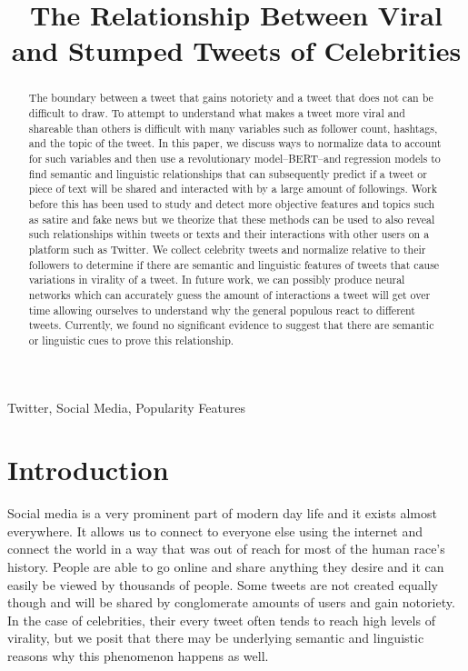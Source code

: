 \documentclass{article}
\title{The Relationship Between Viral and Stumped Tweets of Celebrities}
\begin{document}
\maketitle

\begin{abstract}
The boundary between a tweet that gains notoriety and a tweet that does not can be difficult to draw. 
To attempt to understand what makes a tweet more viral and shareable than others is difficult with many variables such as
follower count, hashtags, and the topic of the tweet. In this paper, we discuss ways to normalize data to account for such variables 
and then use a revolutionary model--BERT--and regression models to find semantic and linguistic relationships that can subsequently predict if a tweet or piece of text 
will be shared and interacted with by a large amount of followings. Work before this has been used to study and detect more objective features and topics such as 
satire and fake news but we theorize that these methods can be used to also reveal such relationships within tweets or texts and their interactions with other users 
on a platform such as Twitter. 
We collect celebrity tweets and normalize relative to their followers to determine if there are semantic and linguistic features of tweets that cause variations in virality of a tweet. 
In future work, we can possibly produce neural networks which can accurately guess the amount of interactions a tweet will get over time allowing ourselves to understand why the general populous react to different tweets. 
Currently, we found no significant evidence to suggest that there are semantic or linguistic cues to prove this relationship.
\end{abstract}

\begin{keywords}
Twitter, Social Media, Popularity Features
\end{keywords}

\section{Introduction}
\label{sec:intro}

Social media is a very prominent part of modern day life and it exists almost everywhere.
It allows us to connect to everyone else using the internet and connect the world in a way that was out of reach for most of the human race's history.
People are able to go online and share anything they desire and it can easily be viewed by thousands of people. 
Some tweets are not created equally though and will be shared by conglomerate amounts of users and gain notoriety. 
In the case of celebrities, their every tweet often tends to reach high levels of virality, but we posit that there may be underlying semantic and linguistic reasons why this phenomenon happens as well.
\end{document}
